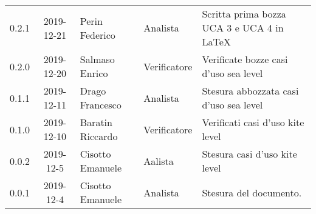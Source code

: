 {\begin{longtable}{ c c  C{4cm}  C{3cm} C{4cm}}
0.2.1 & 2019-12-21 & Perin Federico & Analista & Scritta prima bozza UCA 3 e UCA 4 in LaTeX\\

0.2.0 & 2019-12-20 & Salmaso Enrico & Verificatore & Verificate bozze casi d'uso sea level\\

0.1.1 & 2019-12-11 & Drago Francesco & Analista & Stesura abbozzata casi d'uso sea level\\

0.1.0 & 2019-12-10 & Baratin Riccardo & Verificatore & Verificati casi d'uso kite level\\

0.0.2 & 2019-12-5 & Cisotto Emanuele & Aalista & Stesura casi d'uso kite level\\

0.0.1 & 2019-12-4 & Cisotto Emanuele & Analista & Stesura del documento.  \\		
		
\end{longtable}
}